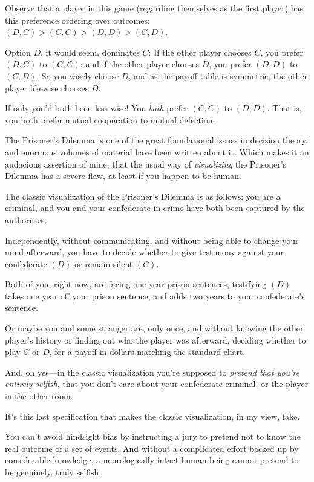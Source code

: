 Observe that a player in this game (regarding themselves as the
first player) has this preference ordering over outcomes: $(D,C)
> (C,C) > (D,D) > (C,D)$.


 Option $D$, it would seem, dominates $C$: If the other player chooses
$C$, you prefer $(D,C)$ to $(C,C)$; and if the other player chooses $D$, you
prefer $(D,D)$ to $(C,D)$. So you wisely choose $D$, and as the payoff table
is symmetric, the other player likewise chooses $D$.


 If only you'd both been less wise! You
\textit{both} prefer $(C,C)$ to $(D,D)$. That is, you both prefer mutual
cooperation to mutual defection.


 The Prisoner's Dilemma is one of the great
foundational issues in decision theory, and enormous volumes of
material have been written about it. Which makes it an audacious
assertion of mine, that the usual way of \textit{visualizing} the
Prisoner's Dilemma has a severe flaw, at least if you
happen to be human.


 The classic visualization of the Prisoner's
Dilemma is as follows: you are a criminal, and you and your confederate
in crime have both been captured by the authorities.


 Independently, without communicating, and without being able to
change your mind afterward, you have to decide whether to give
testimony against your confederate $(D)$ or remain silent $(C)$.


 Both of you, right now, are facing one-year prison sentences;
testifying $(D)$ takes one year off your prison sentence, and adds two
years to your confederate's sentence.


 Or maybe you and some stranger are, only once, and without knowing
the other player's history or finding out who the
player was afterward, deciding whether to play $C$ or $D$, for a payoff in
dollars matching the standard chart.


 And, oh yes---in the classic visualization you're
supposed to \textit{pretend that you're entirely
selfish}, that you don't care about your confederate
criminal, or the player in the other room.


 It's this last specification that makes the
classic visualization, in my view, fake.


 You can't avoid hindsight bias by instructing a
jury to pretend not to know the real outcome of a set of events. And
without a complicated effort backed up by considerable knowledge, a
neurologically intact human being cannot pretend to be genuinely, truly
selfish.


